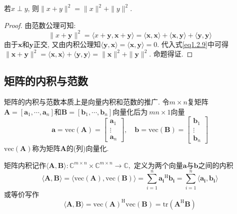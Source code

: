 \documentclass[lang=cn,10pt]{gorgeousnbook}
\numberwithin{equation}{section}%
\numberwithin{figure}{section}%
\begin{document}
\begin{proposition}
若$x\perp y$, 则$\|x+y\|^2=\|x\|^2+\|y\|^2$. 
\end{proposition}
\begin{proof}
由范数公理可知:
\begin{equation}
\|x+\boldsymbol{y}\|^2=\langle x+\boldsymbol{y},\boldsymbol{x}+\boldsymbol{y}\rangle=\langle\boldsymbol{x},\boldsymbol{x}\rangle+\langle\boldsymbol{x},\boldsymbol{y}\rangle+\langle\boldsymbol{y},\boldsymbol{y}\rangle \label{eq1.2.9}
\end{equation}
由于$\bm{x}$和$\bm{y}$正交, 又由内积公理知$\langle\boldsymbol{y},\boldsymbol{x}\rangle=\langle\boldsymbol{x},\boldsymbol{y}\rangle=0$. 代入式\eqref{eq1.2.9}中可得$\|\boldsymbol{x}+\boldsymbol{y}\|^2=\langle\boldsymbol{x},\boldsymbol{x}\rangle+\langle\boldsymbol{y},\boldsymbol{y}\rangle=\|\boldsymbol{x}\|^2+\|\boldsymbol{y}\|^2$. 命题得证. 
\end{proof}


\subsection{矩阵的内积与范数}
矩阵的内积与范数本质上是向量内积和范数的推广. 令$m\times n$复矩阵$\bm{A}=[\boldsymbol{a}_1,\cdots,\boldsymbol{a}_n]$和$\bm{B}=[\bm{b}_1,\cdots,\bm{b}_n]$向量化后为$\mathrm{~}mn\times1$向量
\begin{equation}
\boldsymbol{a}=\mathrm{vec}(\boldsymbol{A})=\begin{bmatrix}\boldsymbol{a}_1\\\vdots\\\boldsymbol{a}_n\end{bmatrix},\quad\boldsymbol{b}=\mathrm{vec}(\boldsymbol{B})=\begin{bmatrix}\boldsymbol{b}_1\\\vdots\\\boldsymbol{b}_n\end{bmatrix}
\end{equation}
$\mathrm{vec}(\boldsymbol{A})$称为矩阵$\bm{A}$的(列)向量化. 

矩阵内积记作$\langle\boldsymbol{A},\boldsymbol{B}\rangle:\mathbb{C}^{m\times n}\times\mathbb{C}^{m\times n}\to\mathbb{C},$ 定义为两个向量$\bm{a}$与$\bm{b}$之间的内积
\begin{equation}
\langle\boldsymbol{A},\boldsymbol{B}\rangle=\langle\mathrm{vec}(\boldsymbol{A}),\mathrm{vec}(\boldsymbol{B})\rangle=\sum_{i=1}^n\boldsymbol{a_i}^\mathrm{H}\boldsymbol{b_i}=\sum_{i=1}^n\langle\boldsymbol{a_i},\boldsymbol{b_i}\rangle 
\end{equation}
或等价写作
\begin{equation}
\langle\boldsymbol{A},\boldsymbol{B}\rangle=\mathrm{vec}(\boldsymbol{A})^\mathrm{H}\mathrm{vec}(\boldsymbol{B})=\mathrm{tr}(\boldsymbol{A}^\mathrm{H}\boldsymbol{B})
\end{equation}
\end{document}
